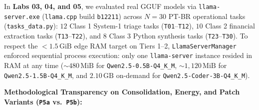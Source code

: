 \documentclass[10pt,a4paper]{article}
\begin{document}
In \textbf{Labs 03, 04, and 05}, we evaluated real GGUF models via \texttt{llama-server.exe} (\texttt{llama.cpp} build \texttt{b12211}) across $N=30$ PT-BR operational tasks (\texttt{tasks\_data.py}): $12$ Class 1 System-1 triage tasks (\texttt{T01}--\texttt{T12}), $10$ Class 2 financial extraction tasks (\texttt{T13}--\texttt{T22}), and $8$ Class 3 Python synthesis tasks (\texttt{T23}--\texttt{T30}). To respect the $<1.5\,\text{GiB}$ edge RAM target on Tiers 1--2, \texttt{LlamaServerManager} enforced sequential process execution: only one \texttt{llama-server} instance resided in RAM at any time ($\sim 480\,\text{MiB}$ for \texttt{Qwen2.5-0.5B-Q4\_K\_M}, $\sim 1,120\,\text{MiB}$ for \texttt{Qwen2.5-1.5B-Q4\_K\_M}, and $2.10\,\text{GB}$ on-demand for \texttt{Qwen2.5-Coder-3B-Q4\_K\_M}).

\textbf{Methodological Transparency on Consolidation, Energy, and Patch Variants (\texttt{P5a} vs.\ \texttt{P5b}):}
\end{document}
